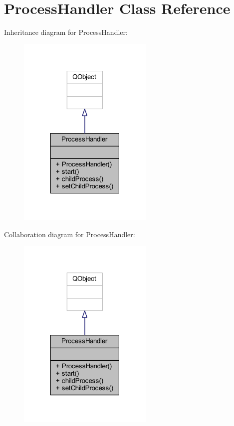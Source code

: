 \hypertarget{class_process_handler}{}\section{Process\+Handler Class Reference}
\label{class_process_handler}


Inheritance diagram for Process\+Handler\+:\nopagebreak
\begin{figure}[H]
\begin{center}
\leavevmode
\includegraphics[width=183pt]{d2/d5a/class_process_handler__inherit__graph}
\end{center}
\end{figure}


Collaboration diagram for Process\+Handler\+:\nopagebreak
\begin{figure}[H]
\begin{center}
\leavevmode
\includegraphics[width=183pt]{d0/d82/class_process_handler__coll__graph}
\end{center}
\end{figure}
